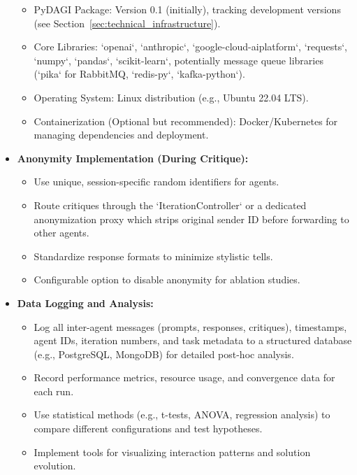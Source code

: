 \documentclass[12pt]{amsart}
\begin{document}
\begin{itemize}[leftmargin=*]
\begin{itemize}
            \item PyDAGI Package: Version 0.1 (initially), tracking development versions (see Section~\ref{sec:technical_infrastructure}).
            \item Core Libraries: `openai`, `anthropic`, `google-cloud-aiplatform`, `requests`, `numpy`, `pandas`, `scikit-learn`, potentially message queue libraries (`pika` for RabbitMQ, `redis-py`, `kafka-python`).
            \item Operating System: Linux distribution (e.g., Ubuntu 22.04 LTS).
            \item Containerization (Optional but recommended): Docker/Kubernetes for managing dependencies and deployment.
        \end{itemize}
    \item \textbf{Anonymity Implementation (During Critique):}
        \begin{itemize}
            \item Use unique, session-specific random identifiers for agents.
            \item Route critiques through the `IterationController` or a dedicated anonymization proxy which strips original sender ID before forwarding to other agents.
            \item Standardize response formats to minimize stylistic tells.
            \item Configurable option to disable anonymity for ablation studies.
        \end{itemize}
    \item \textbf{Data Logging and Analysis:}
        \begin{itemize}
            \item Log all inter-agent messages (prompts, responses, critiques), timestamps, agent IDs, iteration numbers, and task metadata to a structured database (e.g., PostgreSQL, MongoDB) for detailed post-hoc analysis.
            \item Record performance metrics, resource usage, and convergence data for each run.
            \item Use statistical methods (e.g., t-tests, ANOVA, regression analysis) to compare different configurations and test hypotheses.
            \item Implement tools for visualizing interaction patterns and solution evolution.
        \end{itemize}
\end{itemize}
\end{document}
